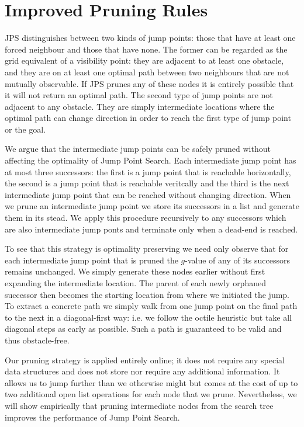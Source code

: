 \section{Improved Pruning Rules}
\label{sec::pruning}
JPS distinguishes between two kinds of jump points: those that have at least
one forced neighbour and those that have none. The former can be regarded as
the grid equivalent of a visibility point: they are adjacent to at least one
obstacle, and they are on at least one optimal path between two neighbours
that are not mutually observable. If JPS prunes any of these nodes it is
entirely possible that it will not return an optimal path.  The second type of
jump points are not adjacent to any obstacle. They are simply intermediate
locations where the optimal path can change direction in order to reach the
first type of jump point or the goal.
\par
We argue that the intermediate jump points can be safely pruned without
affecting the optimality of Jump Point Search.  
Each intermediate jump point has at most three successors: the first is a jump 
point that is reachable horizontally, the second is a jump point that is reachable 
veritcally and the third is the next intermediate jump point that can be reached 
without changing direction.
When we prune an intermediate jump point we store its successors in a list and
generate them in its stead. We apply this procedure recursively to any
successors which are also intermediate jump ponts and terminate only when a
dead-end is reached.  

To see that this strategy is optimality preserving we need only observe that
for each intermediate jump point that is pruned the $g$-value of any of its
successors remains unchanged. We simply generate these nodes earlier without
first expanding the intermediate location.  The parent of each newly orphaned
successor then becomes the starting location from where we initiated the jump. To
extract a concrete path we simply walk from one jump point on the final
path to the next in a diagonal-first way: i.e. we follow the octile heuristic but 
take all diagonal steps as early as possible. Such a path is guaranteed to be 
valid and thus obstacle-free.

Our pruning strategy is applied entirely online; it does not require any
special data structures and does not store nor require any additional
information.  It allows us to jump further than we otherwise might but comes
at the cost of up to two additional open list operations for each node that we
prune. Nevertheless, we will show empirically that pruning intermediate nodes
from the search tree improves the performance of Jump Point Search.
